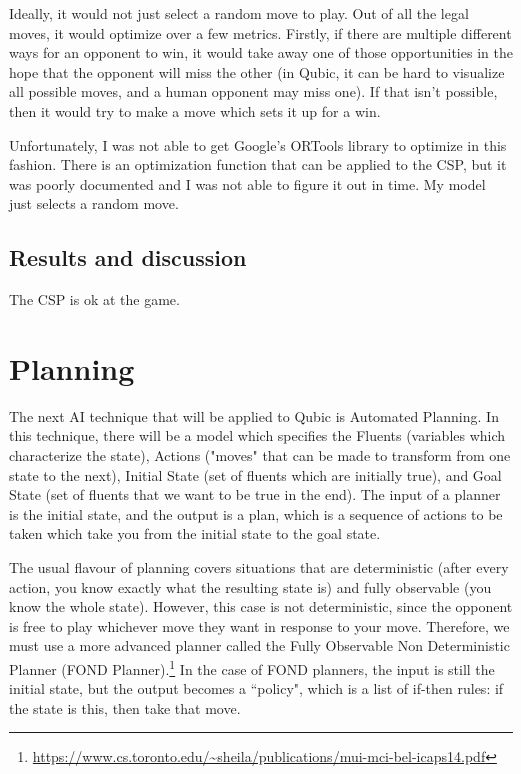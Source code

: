 \documentclass[11pt]{article}
\begin{document}
Ideally, it would not just select a random move to play. Out of all the legal moves, it would optimize over a few metrics. Firstly, if there are multiple different ways for an opponent to win, it would take away one of those opportunities in the hope that the opponent will miss the other (in Qubic, it can be hard to visualize all possible moves, and a human opponent may miss one). If that isn't possible, then it would try to make a move which sets it up for a win.

Unfortunately, I was not able to get Google's ORTools library to optimize in this fashion. There is an optimization function that can be applied to the CSP, but it was poorly documented and I was not able to figure it out in time. My model just selects a random move.


\subsection{Results and discussion}
The CSP is ok at the game. 


\section{Planning}
The next AI technique that will be applied to Qubic is Automated Planning. In this technique, there will be a model which specifies the Fluents (variables which characterize the state), Actions ("moves" that can be made to transform from one state to the next), Initial State (set of fluents which are initially true), and Goal State (set of fluents that we want to be true in the end). The input of a planner is the initial state, and the output is a plan, which is a sequence of actions to be taken which take you from the initial state to the goal state.

The usual flavour of planning covers situations that are deterministic (after every action, you know exactly what the resulting state is) and fully observable (you know the whole state). However, this case is not deterministic, since the opponent is free to play whichever move they want in response to your move. Therefore, we must use a more advanced planner called the Fully Observable Non Deterministic Planner (FOND Planner).\footnote{\url{https://www.cs.toronto.edu/~sheila/publications/mui-mci-bel-icaps14.pdf}} In the case of FOND planners, the input is still the initial state, but the output becomes a ``policy", which is a list of if-then rules: if the state is this, then take that move.
\end{document}
